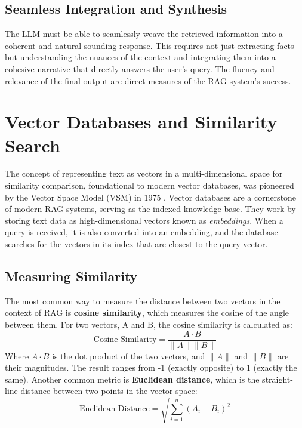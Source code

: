 \subsection{Seamless Integration and Synthesis}
The LLM must be able to seamlessly weave the retrieved information into a coherent and natural-sounding response. This requires not just extracting facts but understanding the nuances of the context and integrating them into a cohesive narrative that directly answers the user's query. The fluency and relevance of the final output are direct measures of the RAG system's success.

\section{Vector Databases and Similarity Search}
The concept of representing text as vectors in a multi-dimensional space for similarity comparison, foundational to modern vector databases, was pioneered by the Vector Space Model (VSM) in 1975 \autocite{salton1975vector}. Vector databases are a cornerstone of modern RAG systems, serving as the indexed knowledge base. They work by storing text data as high-dimensional vectors known as \textit{embeddings}. When a query is received, it is also converted into an embedding, and the database searches for the vectors in its index that are closest to the query vector.



\subsection{Measuring Similarity}
The most common way to measure the distance between two vectors in the context of RAG is \textbf{cosine similarity}, which measures the cosine of the angle between them. For two vectors, A and B, the cosine similarity is calculated as:
\begin{equation}
\text{Cosine Similarity} = \frac{A \cdot B}{\|A\| \|B\|}
\end{equation}
Where \(A \cdot B\) is the dot product of the two vectors, and \(\|A\|\) and \(\|B\|\) are their magnitudes. The result ranges from -1 (exactly opposite) to 1 (exactly the same).
Another common metric is \textbf{Euclidean distance}, which is the straight-line distance between two points in the vector space:
\begin{equation}
\text{Euclidean Distance} = \sqrt{\sum_{i=1}^{n} (A_i - B_i)^2}
\end{equation}

